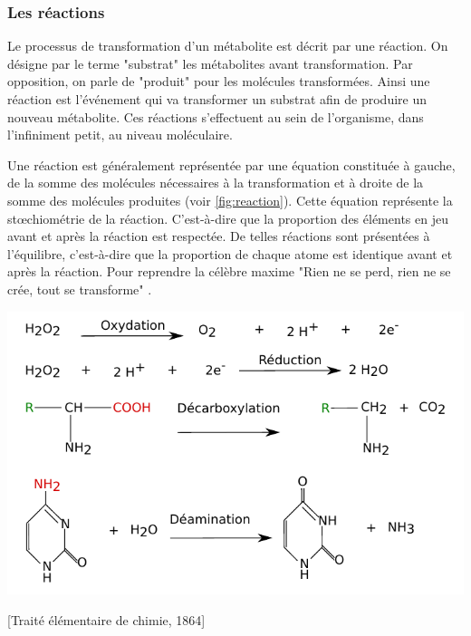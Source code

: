 \begin{refsegment}
	\subsubsection{Les réactions}
	Le processus de transformation d’un métabolite est décrit par une réaction. On désigne par le terme "substrat" les métabolites avant transformation. Par opposition, on parle de "produit" pour les molécules transformées. Ainsi une réaction est l'événement qui va transformer un substrat afin de produire un nouveau métabolite. Ces réactions s'effectuent au sein de l'organisme, dans l'infiniment petit, au niveau moléculaire.
    
    Une réaction est généralement représentée par une équation constituée à gauche, de la somme des molécules nécessaires à la transformation et à droite de la somme des molécules produites (voir \cref{fig:reaction}). Cette équation  représente la stœchiométrie de la réaction. C’est-à-dire que la proportion des éléments en jeu avant et après la réaction est respectée. De telles réactions sont présentées à l'équilibre, c'est-à-dire que la proportion de chaque atome est identique avant et après la réaction. Pour reprendre la célèbre maxime "Rien ne se perd, rien ne se crée, tout se transforme" .
    
    \begin{shadedfigure}[H]
        \centering
        \includegraphics[width=\textwidth]{img/equation_reaction.pdf}
        \caption{Représentation de réactions sous leur forme "équation-bilan" .}
        \label{fig:reaction}
    \end{shadedfigure}
    
    [Traité élémentaire de chimie, 1864]
    

\end{refsegment}
